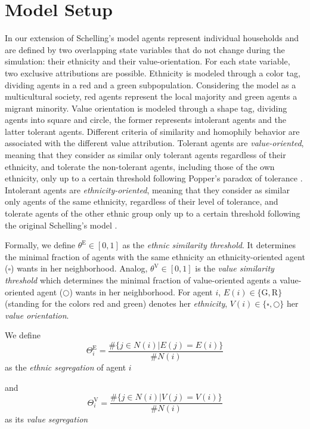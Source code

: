 \documentclass{ws-acs}
\begin{document}
{\section{Model Setup}
In our extension of Schelling's model agents represent individual households and are defined by two overlapping state variables that do not change during the simulation: their ethnicity and their value-orientation. For each state variable, two exclusive attributions are possible. Ethnicity is modeled through a color tag, dividing agents in a red and a green subpopulation. Considering the model as a multicultural society, red agents represent the local majority and green agents  a migrant minority. Value orientation is modeled through a shape tag, dividing agents into square and circle, the former represents intolerant agents and the latter tolerant agents. Different criteria of similarity and homophily behavior are associated with the different value attribution. Tolerant agents are {\it value-oriented}, meaning that they consider as similar only tolerant agents regardless of their ethnicity, and tolerate the non-tolerant agents, including those of the own ethnicity, only up to a certain threshold following Popper's paradox of tolerance \cite{popper45}. Intolerant agents are {\it ethnicity-oriented}, meaning that they consider as similar only agents of the same ethnicity, regardless of their level of tolerance, and tolerate agents of the other ethnic group only up to a certain threshold following the original Schelling's model \cite{schelling69}.

Formally, we define $\theta^\text{E} \in [0,1]$ as the {\it ethnic similarity threshold}. It determines the minimal fraction of agents with the same ethnicity an ethnicity-oriented agent ($\square$) wants in her neighborhood. Analog, $\theta^\text{V} \in [0,1]$ is the {\it value similarity threshold} which determines the minimal fraction of value-oriented agents a value-oriented agent ($\bigcirc$) wants in her neighborhood. For agent $i$, $E(i) \in \{\text{G},\text{R}\}$ (standing for the colors red and green) denotes her {\it ethnicity}, $V(i) \in \{\square,\bigcirc\}$ her {\it value orientation}.

We define
\begin{equation} \label{eq:ethnic segregation}
\Theta^\text{E}_i = \frac{\#\{j \in N(i) | E(j)=E(i)\}}{\#N(i)}
\end{equation}
as the {\it ethnic segregation} of agent $i$

and 
\begin{equation}\label{eq:value segregation}
\Theta^\text{V}_i = \frac{\#\{j \in N(i) | V(j)=V(i)\}}{\#N(i)} 
\end{equation}
as its {\it value segregation}

}
\end{document}

